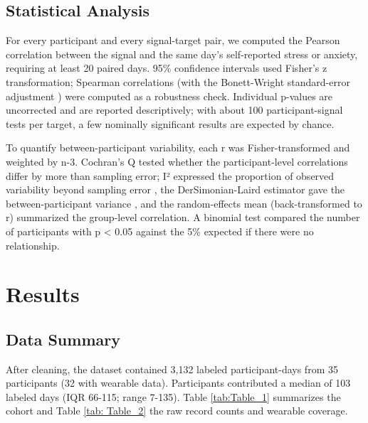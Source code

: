 \documentclass[11pt, a4paper, oneside]{article}
\begin{document}
\subsection{Statistical Analysis}
For every participant and every signal-target pair, we computed the Pearson correlation between the signal and the same day's self-reported stress or anxiety, requiring at least 20 paired days. 95\% confidence intervals used Fisher's z transformation; Spearman correlations (with the Bonett-Wright standard-error adjustment \cite{reference 10}) were computed as a robustness check. Individual p-values are uncorrected and are reported descriptively; with about 100 participant-signal tests per target, a few nominally significant results are expected by chance.

To quantify between-participant variability, each r was Fisher-transformed and weighted by n-3. Cochran's Q tested whether the participant-level correlations differ by more than sampling error; I² expressed the proportion of observed variability beyond sampling error \cite{reference 12}, the DerSimonian-Laird estimator gave the between-participant variance \cite{reference 11}, and the random-effects mean (back-transformed to r) summarized the group-level correlation. A binomial test compared the number of participants with p < 0.05 against the 5\% expected if there were no relationship.

\section{Results}

\subsection{Data Summary}
After cleaning, the dataset contained 3,132 labeled participant-days from 35 participants (32 with wearable data). Participants contributed a median of 103 labeled days (IQR 66-115; range 7-135). Table \ref{tab:Table_1} summarizes the cohort and Table \ref{tab: Table_2} the raw record counts and wearable coverage.
\end{document}
